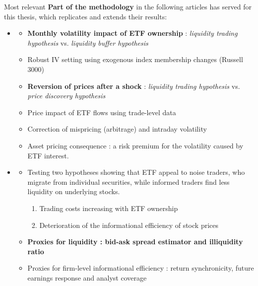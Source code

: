 \documentclass[9pt, usenames, dvipsnames]{beamer}
\begin{document}
\begin{frame}[allowframebreaks]
  \begin{exampleblock}{Most relevant}
    {\bfseries Part of the methodology} in the following articles has served for this thesis, which replicates and extends their results:
    \begin{itemize}
    \item \textcite{Ben-David2018}
      \begin{itemize}
      \item {\bfseries Monthly volatility impact of ETF ownership} : \emph{liquidity trading hypothesis} vs. \emph{liquidity buffer hypothesis}
      \item Robust IV setting using exogenous index membership changes (Russell 3000)
      \item {\bfseries Reversion of prices after a shock} : \emph{liquidity trading hypothesis} vs. \emph{price discovery hypothesis}
      \item Price impact of ETF flows using trade-level data
      \item Correction of mispricing (arbitrage) and intraday volatility
      \item Asset pricing consequence : a risk premium for the volatility caused by ETF interest.      
      \end{itemize}
    \item \textcite{Israeli2017}
      \begin{itemize}
      \item Testing two hypotheses showing that ETF appeal to noise traders, who migrate from individual securities, while informed traders find less liquidity on underlying stocks.
        \begin{enumerate}
        \item Trading costs increasing with ETF ownership
        \item Deterioration of the informational efficiency of stock prices
        \end{enumerate}
      \item {\bfseries Proxies for liquidity : bid-ask spread estimator and \textcite{Amihud2002} illiquidity ratio}
      \item Proxies for firm-level informational efficiency : return synchronicity, future earnings response and analyst coverage
      \end{itemize}
    \end{itemize}
  \end{exampleblock}
\end{frame}
\end{document}
